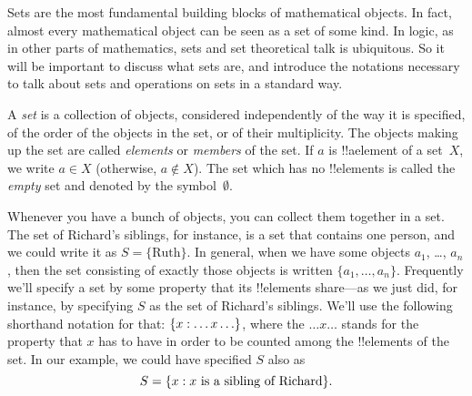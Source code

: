 \documentclass[../../../include/open-logic-section]{subfiles}
\begin{document}

\begin{explain}
Sets are the most fundamental building blocks of mathematical
objects. In fact, almost every mathematical object can be seen as a
set of some kind. In logic, as in other parts of mathematics, sets
and set theoretical talk is ubiquitous. So it will be important to
discuss what sets are, and introduce the notations necessary to talk
about sets and operations on sets in a standard way.
\end{explain}

\begin{defn}
A \emph{set} is a collection of objects, considered independently of
the way it is specified, of the order of the objects in the set, or of
their multiplicity. The objects making up the set are called
\emph{elements} or \emph{members} of the set. If $a$ is !!a{element}
of a set~$X$, we write $a \in X$ (otherwise, $a \notin X$). The set
which has no !!{element}s is called the \emph{empty} set and denoted
by the symbol~$\emptyset$.
\end{defn}

\begin{ex}
Whenever you have a bunch of objects, you can collect them together in
a set. The set of Richard's siblings, for instance, is a set that
contains one person, and we could write it as $S=\{\textrm{Ruth}\}$.
In general, when we have some objects $a_{1}$, \dots, $a_{n}$, then
the set consisting of exactly those objects is written $\{
a_{1}, \dots, a_{n}\}$. Frequently we'll specify a set by some
property that its !!{element}s share---as we just did, for instance, by
specifying $S$ as the set of Richard's siblings. We'll use the
following shorthand notation for that: $\{ x : \ldots x\ldots \}$,
where the $\ldots x\ldots$ stands for the property that $x$ has to
have in order to be counted among the !!{element}s of the set. In our
example, we could have specified $S$ also as
\[
S = \{ x : x \text{ is a sibling of Richard} \}.
\]
\end{ex}
\end{document}
